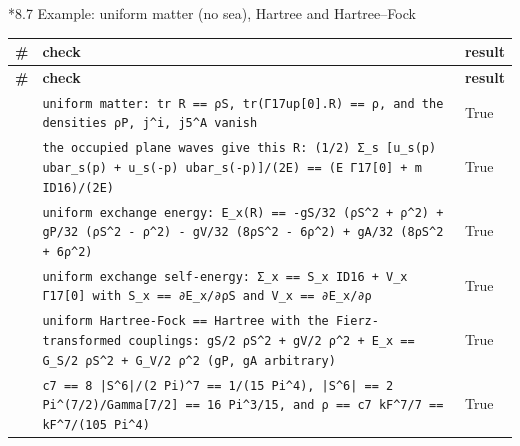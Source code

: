 \documentclass[10pt,a4paper]{article}
\makeatletter
\renewcommand\subsubsection{\@startsection{subsubsection}{3}{\z@}{-3.25ex\@plus -1ex \@minus -.2ex}{1.5ex \@plus .2ex}{\normalfont\normalsize\bfseries\raggedright}}
\makeatother
\begin{document}
\subsubsection*{8.7 Example: uniform matter (no sea), Hartree and Hartree–Fock}
{\footnotesize
\begin{longtable}{>{\raggedright\arraybackslash}p{}>{\raggedright\arraybackslash}p{}>{\raggedright\arraybackslash}p{}}
\toprule
\textbf{\#} & \textbf{check} & \textbf{result} \\
\midrule\endfirsthead
\toprule
\textbf{\#} & \textbf{check} & \textbf{result} \\
\midrule\endhead
\endfoot
\bottomrule\endlastfoot
47 & \texttt{uniform matter: tr R == ρS, tr(Γ17up[0].R) == ρ, and the densities ρP, j\textasciicircum{}i, j5\textasciicircum{}A vanish} & True \\
48 & \texttt{the occupied plane waves give this R: (1/\allowbreak{}2) Σ\_\allowbreak{}s [u\_\allowbreak{}s(p) ubar\_\allowbreak{}s(p) + u\_\allowbreak{}s(-p) ubar\_\allowbreak{}s(-p)]/\allowbreak{}(2E) == (E Γ17[0] + m ID16)/\allowbreak{}(2E)} & True \\
49 & \texttt{uniform exchange energy: E\_\allowbreak{}x(R) == -gS/\allowbreak{}32 (ρS\textasciicircum{}2 + ρ\textasciicircum{}2) + gP/\allowbreak{}32 (ρS\textasciicircum{}2 - ρ\textasciicircum{}2) - gV/\allowbreak{}32 (8ρS\textasciicircum{}2 - 6ρ\textasciicircum{}2) + gA/\allowbreak{}32 (8ρS\textasciicircum{}2 + 6ρ\textasciicircum{}2)} & True \\
50 & \texttt{uniform exchange self-energy: Σ\_\allowbreak{}x == S\_\allowbreak{}x ID16 + V\_\allowbreak{}x Γ17[0] with S\_\allowbreak{}x == ∂E\_\allowbreak{}x/\allowbreak{}∂ρS and V\_\allowbreak{}x == ∂E\_\allowbreak{}x/\allowbreak{}∂ρ} & True \\
51 & \texttt{uniform Hartree-Fock == Hartree with the Fierz-transformed couplings: gS/\allowbreak{}2 ρS\textasciicircum{}2 + gV/\allowbreak{}2 ρ\textasciicircum{}2 + E\_\allowbreak{}x == G\_\allowbreak{}S/\allowbreak{}2 ρS\textasciicircum{}2 + G\_\allowbreak{}V/\allowbreak{}2 ρ\textasciicircum{}2 (gP, gA arbitrary)} & True \\
52 & \texttt{c7 == 8 |S\textasciicircum{}6|/\allowbreak{}(2 Pi)\textasciicircum{}7 == 1/\allowbreak{}(15 Pi\textasciicircum{}4), |S\textasciicircum{}6| == 2 Pi\textasciicircum{}(7/\allowbreak{}2)/\allowbreak{}Gamma[7/\allowbreak{}2] == 16 Pi\textasciicircum{}3/\allowbreak{}15, and ρ == c7 kF\textasciicircum{}7/\allowbreak{}7 == kF\textasciicircum{}7/\allowbreak{}(105 Pi\textasciicircum{}4)} & True \\

\end{longtable}}
\end{document}
